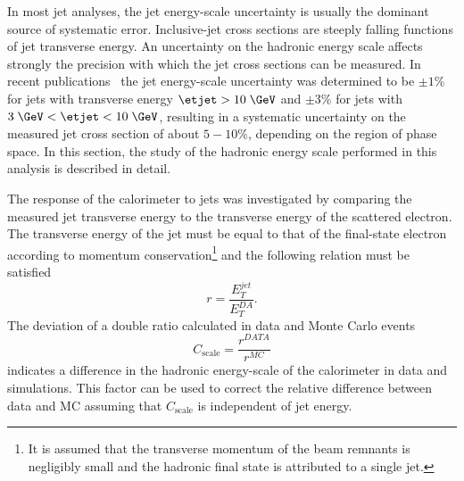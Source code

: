 In most jet analyses, the jet energy-scale uncertainty is usually the dominant source of systematic error. Inclusive-jet cross sections are steeply falling functions of jet transverse energy. An uncertainty on the hadronic energy scale affects strongly the precision with which the jet cross sections can be measured. In recent \zeus publications~\cite{epj:c70:965, np:b864:1} the jet energy-scale uncertainty was determined to be $\pm 1\%$ for jets with transverse energy $\etjet>10\; \GeV$ and $\pm 3\%$ for jets with $3\; \GeV<\etjet < 10\; \GeV$, resulting in a systematic uncertainty on the measured jet cross section of about $5-10\%$, depending on the region of phase space. In this section, the study of the hadronic energy scale performed in this analysis is described in detail.

The response of the calorimeter to jets was investigated by comparing the measured jet transverse energy to the transverse energy of the scattered electron. The transverse energy of the jet must be equal to that of the final-state electron according to momentum conservation\footnote{It is assumed that the transverse momentum of the beam remnants is negligibly small and the hadronic final state is attributed to a single jet.} and the following relation must be satisfied
\begin{equation}
r = \frac{E_T^{jet}}{E_T^{DA}}.
\label{eq:etjetetelbalance}
\end{equation}
The deviation of a double ratio calculated in data and Monte Carlo events
\begin{equation}
C_\text{scale} = \frac{r^{DATA}}{r^{MC}} 
\label{eq:cscale}
\end{equation}
indicates a difference in the hadronic energy-scale of the calorimeter in data and simulations. This factor can be used to correct the relative difference between data and MC assuming that $C_\text{scale}$ is independent of jet energy. 

